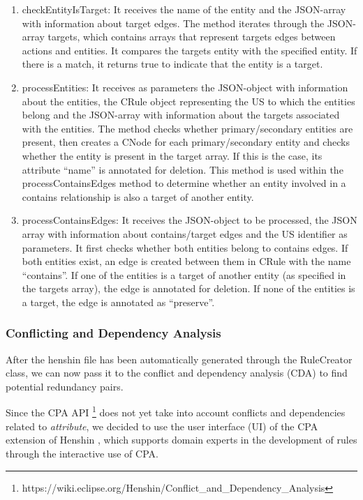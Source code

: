 \begin{enumerate}
	\item checkEntityIsTarget: It receives the name of the entity and the JSON-array with information about target edges. The method iterates through the JSON-array targets, which contains arrays that represent targets edges between actions and entities. It compares the targets entity with the specified entity. If there is a match, it returns true to indicate that the entity is a target.
	\item processEntities: It receives as parameters the JSON-object with information about the entities, the CRule object representing the US to which the entities belong and the JSON-array with information about the targets associated with the entities. The method checks whether primary/secondary entities are present, then creates a CNode for each primary/secondary entity and checks whether the entity is present in the target array. If this is the case, its attribute \enquote{name} is annotated for deletion. This method is used within the processContainsEdges method to determine whether an entity involved in a contains relationship is also a target of another entity.
	\item processContainsEdges: It receives the JSON-object to be processed, the JSON array with information about contains/target edges and the US identifier as parameters. It first checks whether both entities belong to contains edges. If both entities exist, an edge is created between them in CRule with the name \enquote{contains}. If one of the entities is a target of another entity (as specified in the targets array), the edge is annotated for deletion. If none of the entities is a target, the edge is annotated as \enquote{preserve}.
\end{enumerate}
\subsubsection*{Conflicting and Dependency Analysis}
After the henshin file has been automatically generated through the RuleCreator class, we can now pass it to the conflict and dependency analysis (CDA) to find potential redundancy pairs.

Since the CPA API \footnote{https://wiki.eclipse.org/Henshin/Conflict\_and\_Dependency\_Analysis} does not yet take into account conflicts and dependencies related to \textit{attribute}, we decided to use the user interface (UI) of the CPA extension of Henshin , which supports domain experts in the development of rules through the interactive use of CPA.

